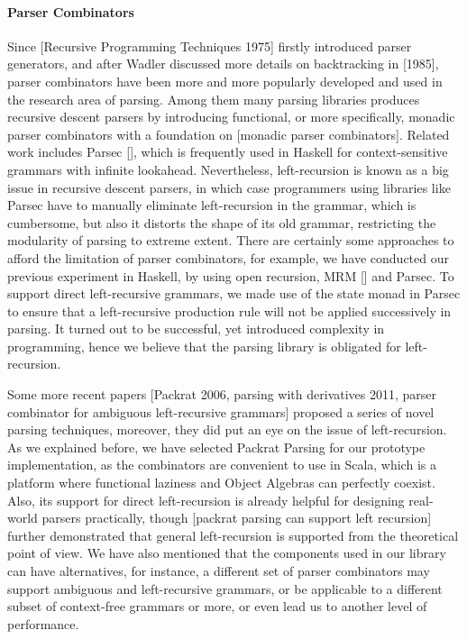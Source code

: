 \paragraph*{Parser Combinators} Since [Recursive Programming Techniques 1975] firstly introduced parser generators, and after Wadler discussed more details on backtracking in [1985], parser combinators have been more and more popularly developed and used in the research area of parsing. Among them many parsing libraries produces recursive descent parsers by introducing functional, or more specifically, monadic parser combinators with a foundation on [monadic parser combinators]. Related work includes Parsec [], which is frequently used in Haskell for context-sensitive grammars with infinite lookahead. Nevertheless, left-recursion is known as a big issue in recursive descent parsers, in which case programmers using libraries like Parsec have to manually eliminate left-recursion in the grammar, which is cumbersome, but also it distorts the shape of its old grammar, restricting the modularity of parsing to extreme extent.
There are certainly some approaches to afford the limitation of parser combinators, for example, we have conducted our previous experiment in Haskell, by using open recursion, MRM [] and Parsec. To support direct left-recursive grammars, we made use of the state monad in Parsec to ensure that a left-recursive production rule will not be applied successively in parsing. It turned out to be successful, yet introduced complexity in programming, hence we believe that the parsing library is obligated for left-recursion.

Some more recent papers [Packrat 2006, parsing with derivatives 2011, parser combinator for ambiguous left-recursive grammars] proposed a series of novel parsing techniques, moreover, they did put an eye on the issue of left-recursion. As we explained before, we have selected Packrat Parsing for our prototype implementation, as the combinators are convenient to use in Scala, which is a platform where functional laziness and Object Algebras can perfectly coexist. Also, its support for direct left-recursion is already helpful for designing real-world parsers practically, though [packrat parsing can support left recursion] further demonstrated that general left-recursion is supported from the theoretical point of view. We have also mentioned that the components used in our library can have alternatives, for instance, a different set of parser combinators may support ambiguous and left-recursive grammars, or be applicable to a different subset of context-free grammars or more, or even lead us to another level of performance.

